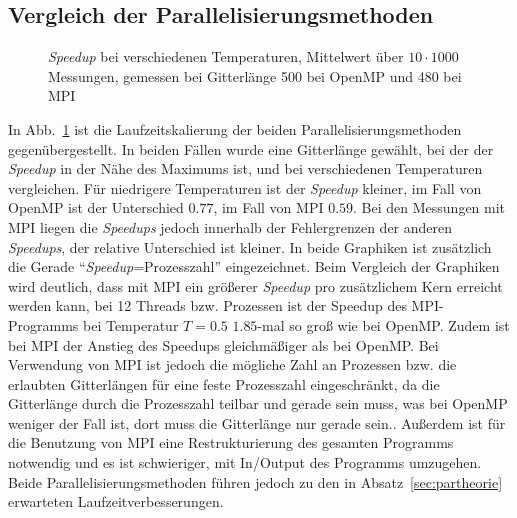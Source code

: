 \subsection{Vergleich der Parallelisierungsmethoden}
%	
	\begin{figure}[htbp]
		
		\caption[\textit{Speedup}  bei verschiedenen Temperaturen]{\textit{Speedup} bei verschiedenen Temperaturen, Mittelwert über $10 \cdot 1000$ Messungen, gemessen bei Gitterlänge 500 bei OpenMP und 480 bei MPI}
		\label{fig:skalierungtemp}
	\end{figure}
	
	In Abb.~\ref{fig:skalierungtemp} ist die Laufzeitskalierung der beiden Parallelisierungsmethoden gegenübergestellt. 
	In beiden Fällen wurde eine Gitterlänge gewählt, bei der der \textit{Speedup} in der Nähe des Maximums ist, und bei verschiedenen Temperaturen vergleichen. Für niedrigere Temperaturen ist der \textit{Speedup} kleiner, im Fall von OpenMP ist der Unterschied $\num{0,77}$, im Fall von MPI $\num{0,59}$. Bei den Messungen mit MPI liegen die \textit{Speedups} jedoch innerhalb der Fehlergrenzen der anderen \textit{Speedups}, der relative Unterschied ist kleiner.
	In beide Graphiken ist zusätzlich die Gerade \enquote{\textit{Speedup}=Prozesszahl} eingezeichnet.
	Beim Vergleich der Graphiken wird deutlich, dass mit MPI ein größerer \textit{Speedup} pro zusätzlichem Kern erreicht werden kann, bei 12 Threads bzw. Prozessen ist der Speedup des MPI-Programms bei Temperatur $T=\num{0,5}$ $\num{1,85}$-mal so groß wie bei OpenMP. Zudem ist bei MPI der Anstieg des Speedups gleichmäßiger als bei OpenMP. Bei Verwendung von MPI ist jedoch die mögliche Zahl an Prozessen bzw.{} die erlaubten Gitterlängen für eine feste Prozesszahl eingeschränkt, da die Gitterlänge durch die Prozesszahl teilbar und gerade sein muss, was bei OpenMP weniger der Fall ist, dort muss die Gitterlänge nur gerade sein.. Außerdem ist für die Benutzung von MPI eine Restrukturierung des gesamten Programms notwendig und es ist schwieriger, mit In/Output des Programms umzugehen. Beide Parallelisierungsmethoden führen jedoch zu den in Absatz~\ref{sec:partheorie} erwarteten Laufzeitverbesserungen.
